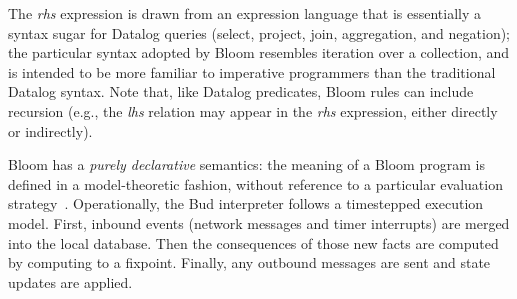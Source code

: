 The \emph{rhs} expression is drawn from an expression language that is
essentially a syntax sugar for Datalog queries (select, project, join,
aggregation, and negation); the particular syntax adopted by Bloom resembles
iteration over a collection, and is intended to be more familiar to imperative
programmers than the traditional Datalog syntax. Note that, like Datalog
predicates, Bloom rules can include recursion (e.g., the \emph{lhs} relation may
appear in the \emph{rhs} expression, either directly or indirectly).

Bloom has a \emph{purely declarative} semantics: the meaning of a Bloom program
is defined in a model-theoretic fashion, without reference to a particular
evaluation strategy~\cite{dedalus}. Operationally, the Bud interpreter follows a
timestepped execution model. First, inbound events (network messages and timer
interrupts) are merged into the local database. Then the consequences of those
new facts are computed by computing to a fixpoint. Finally, any outbound
messages are sent and state updates are applied.


